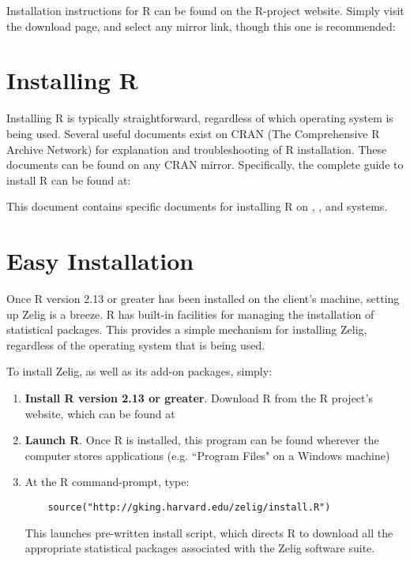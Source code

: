 Installation instructions for R can be found on the R-project website. Simply visit the download page, and select any mirror link, though this one is recommended:

\CranMirror



%
%
\section{Installing R}

Installing R is typically straightforward, regardless of which operating system is being used. Several useful documents exist on CRAN (The Comprehensive R Archive Network) for explanation and troubleshooting of R installation. These documents can be found on any CRAN mirror. Specifically, the complete guide to install R can be found at:

\InstallInstructionsHref

This document contains specific documents for installing R on \MacInstallHref, \WindowsInstallHref, and \UnixInstallHref systems.

%
%
\section{Easy Installation}

Once R version 2.13 or greater has been installed on the client's machine, setting up Zelig is a breeze. R has built-in facilities for managing the installation of statistical packages. This provides a simple mechanism for installing Zelig, regardless of the operating system that is being used.

To install Zelig, as well as its add-on packages, simply:

\begin{enumerate}
	\item {\bf Install R version 2.13 or greater}. Download R from the R project's website, which can be found at \CranMirror
  \item {\bf Launch R}. Once R is installed, this program can be found wherever the computer stores applications (e.g. ``Program Files" on a Windows machine)
  \item At the R command-prompt, type:
    \begin{verbatim}
    source("http://gking.harvard.edu/zelig/install.R")
    \end{verbatim}
    This launches pre-written install script, which directs R to download all the appropriate statistical packages associated with the Zelig software suite.
\end{enumerate}



